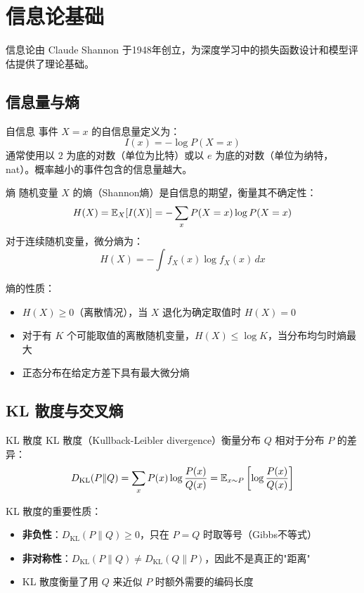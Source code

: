\section{信息论基础}

信息论由 Claude Shannon 于1948年创立，为深度学习中的损失函数设计和模型评估提供了理论基础。

\subsection{信息量与熵}

\begin{mydefinition}{自信息}
事件 $X=x$ 的自信息量定义为：
\[
I(x) = -\log P(X=x)
\]
通常使用以 $2$ 为底的对数（单位为比特）或以 $e$ 为底的对数（单位为纳特，nat）。概率越小的事件包含的信息量越大。
\end{mydefinition}

\begin{mydefinition}{熵}
随机变量 $X$ 的熵（Shannon熵）是自信息的期望，衡量其不确定性：
\[
H(X) = \mathbb{E}_{X}[I(X)] = -\sum_x P(X=x)\log P(X=x)
\]
对于连续随机变量，微分熵为：
\[
H(X) = -\int f_X(x)\log f_X(x)\,dx
\]
\end{mydefinition}

熵的性质：
\begin{itemize}
    \item $H(X)\geq 0$（离散情况），当 $X$ 退化为确定取值时 $H(X)=0$
    \item 对于有 $K$ 个可能取值的离散随机变量，$H(X)\leq \log K$，当分布均匀时熵最大
    \item 正态分布在给定方差下具有最大微分熵
\end{itemize}

\subsection{KL 散度与交叉熵}

\begin{mydefinition}{KL 散度}
KL 散度（Kullback-Leibler divergence）衡量分布 $Q$ 相对于分布 $P$ 的差异：
\[
D_{\mathrm{KL}}(P\|Q) = \sum_x P(x)\log\frac{P(x)}{Q(x)} = \mathbb{E}_{x\sim P}\left[\log\frac{P(x)}{Q(x)}\right]
\]
\end{mydefinition}

KL 散度的重要性质：
\begin{itemize}
    \item \textbf{非负性}：$D_{\mathrm{KL}}(P\|Q)\geq 0$，只在 $P=Q$ 时取等号（Gibbs不等式）
    \item \textbf{非对称性}：$D_{\mathrm{KL}}(P\|Q)\neq D_{\mathrm{KL}}(Q\|P)$，因此不是真正的"距离"
    \item KL 散度衡量了用 $Q$ 来近似 $P$ 时额外需要的编码长度
\end{itemize}

